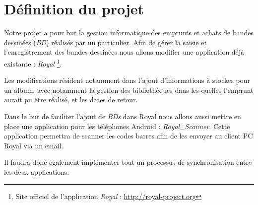 \documentclass[etudiants]{support-iutrs}
\begin{document}
\header
\section*{Définition du projet}

Notre projet a pour but la gestion informatique des emprunts et achats de bandes dessinées (\emph{BD}) réalisés par un particulier.
Afin de gérer la saisie et l'enregistrement des bandes dessinées nous allons modifier une application déjà existante : \emph{Royal}
\footnote{Site officiel de l'application \emph{Royal} : \url{http://royal-project.org}}.

Les modifications résident notamment dans l'ajout d'informations à stocker pour un album, avec notamment la gestion des bibliothèques dans les-quelles l'emprunt aurait pu être réalisé, et les dates de retour. 

Dans le but de faciliter l'ajout de \emph{BDs} dans Royal nous allons aussi mettre en place une application pour les téléphones Android : \emph{Royal\_Scanner}.
Cette application permettra de scanner les codes barres afin de les envoyer au client PC Royal via un email.

Il faudra donc également implémenter tout un processus de synchronisation entre les deux applications. 
\end{document}
